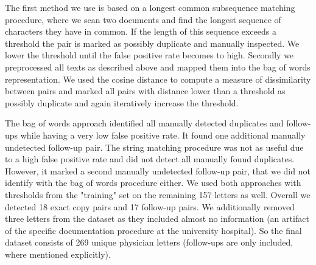The first method we use is based on a longest common subsequence matching procedure, where we scan two documents and find the longest sequence of characters they have in common. If the length of this sequence exceeds a threshold the pair is marked as possibly duplicate and manually inspected. We lower the threshold until the false positive rate becomes to high. Secondly we preprocessed all texts as described above and mapped them into the bag of words representation. We used the cosine distance to compute a measure of dissimilarity between pairs and marked all pairs with distance lower than a threshold as possibly duplicate and again iteratively increase the threshold.

The bag of words approach identified all manually detected duplicates and follow-ups while having a very low false positive rate. It found one additional manually undetected follow-up pair. The string matching procedure was not as useful due to a high false positive rate and did not detect all manually found duplicates. However, it marked a second manually undetected follow-up pair, that we did not identify with the bag of words procedure either. We used both approaches with thresholds from the "training" set on the remaining 157 letters as well. Overall we detected 18 exact copy pairs and 17 follow-up pairs. We additionally removed three letters from the dataset as they included almost no information (an artifact of the specific documentation procedure at the university hospital). So the final dataset consists of 269 unique physician letters (follow-ups are only included, where mentioned explicitly).





